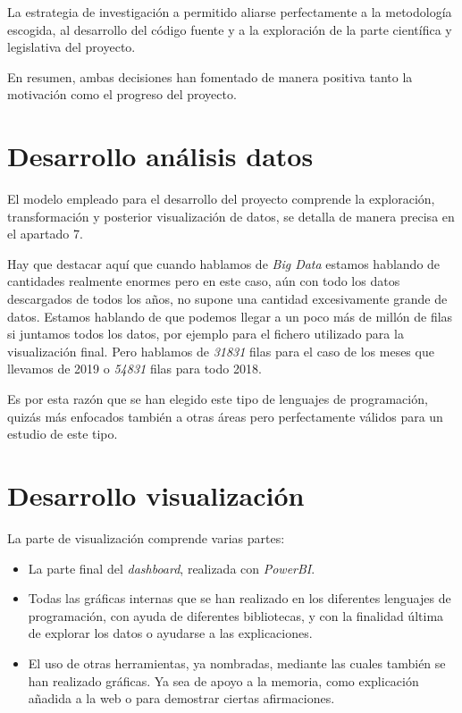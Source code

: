La estrategia de investigación a permitido aliarse perfectamente a la metodología escogida, al desarrollo del código fuente y a la exploración de la parte científica y legislativa del proyecto.

En resumen, ambas decisiones han fomentado de manera positiva tanto la motivación como el progreso del proyecto.


\section{Desarrollo análisis datos}
El modelo empleado para el desarrollo del proyecto comprende la exploración, transformación y posterior visualización de datos, se detalla de manera precisa en el apartado 7. 

Hay que destacar aquí que cuando hablamos de \textit{Big Data} estamos hablando de cantidades realmente enormes pero en este caso, aún con todo los datos descargados de todos los años, no supone una cantidad excesivamente grande de datos. Estamos hablando de que podemos llegar a un poco más de millón de filas si juntamos todos los datos, por ejemplo para el fichero utilizado para la visualización final. Pero hablamos de \textit{31831} filas para el caso de los meses que llevamos de 2019 o \textit{54831} filas para todo 2018. 

Es por esta razón que se han elegido este tipo de lenguajes de programación, quizás más enfocados también a otras áreas pero perfectamente válidos para un estudio de este tipo.

 
\section{Desarrollo visualización}\label{grafico}
La parte de visualización comprende varias partes:

\begin{itemize}
	\item La parte final del \textit{dashboard}, realizada con \textit{PowerBI}.
	\item Todas las gráficas internas que se han realizado en los diferentes lenguajes de programación, con ayuda de diferentes bibliotecas, y con la finalidad última de explorar los datos o ayudarse a las explicaciones.
	\item El uso de otras herramientas, ya nombradas, mediante las cuales también se han realizado gráficas. Ya sea de apoyo a la memoria, como explicación añadida a la web o para demostrar ciertas afirmaciones.
\end{itemize}


